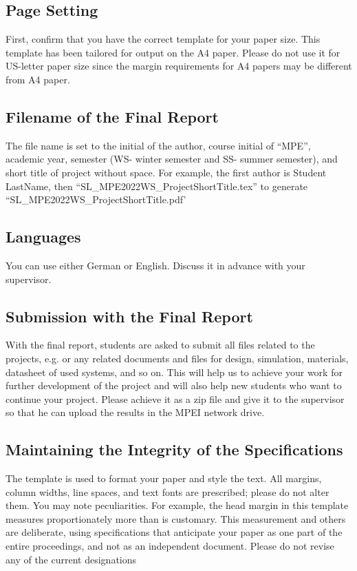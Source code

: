 \documentclass[a4paper, 10pt, conference]{ieeeconf}      %
\begin{document}
\subsection{Page Setting}

First, confirm that you have the correct template for your paper size. This template has been tailored for output on the A4 paper. Please do not use it for US-letter paper size since the margin requirements for A4 papers may be different from A4 paper.

\subsection{Filename of the Final Report}

The file name is set to the initial of the author, course initial of ``MPE'', academic year, semester (WS- winter semester and SS- summer semester), and short title of project without space. For example, the first author is Student LastName, then ``SL\_MPE2022WS\_ProjectShortTitle.tex'' to generate ``SL\_MPE2022WS\_ProjectShortTitle.pdf'

\subsection{Languages}

You can use either German or English. Discuss it in advance with your supervisor. 

\subsection{Submission with the Final Report}

With the final report, students are asked to submit all files related to the projects, e.g. or any related documents and files for design, simulation, materials, datasheet of used systems, and so on. This will help us to achieve your work for further development of the project and will also help new students who want to continue your project. Please achieve it as a zip file and give it to the supervisor so that he can upload the results in the MPEI network drive. 

\subsection{Maintaining the Integrity of the Specifications}

The template is used to format your paper and style the text. All margins, column widths, line spaces, and text fonts are prescribed; please do not alter them. You may note peculiarities. For example, the head margin in this template measures proportionately more than is customary. This measurement and others are deliberate, using specifications that anticipate your paper as one part of the entire proceedings, and not as an independent document. Please do not revise any of the current designations
\end{document}
